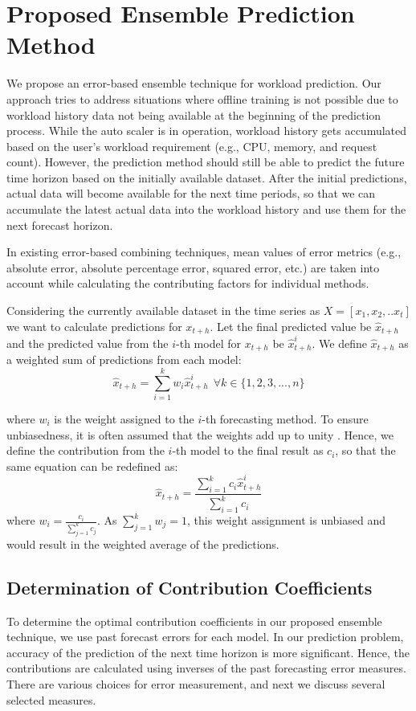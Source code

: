 \section{Proposed Ensemble Prediction Method}

We propose an error-based ensemble technique for workload prediction. Our approach tries to address situations where offline training is not possible due to workload history data not being available at the beginning of the prediction process. While the auto scaler is in operation, workload history gets accumulated based on the user's workload requirement (e.g., CPU, memory, and request count). However, the prediction method should still be able to predict the future time horizon based on the initially available dataset. After the initial predictions, actual data will become available for the next time periods, so that we can accumulate the latest actual data into the workload history and use them for the next forecast horizon.

In existing error-based combining techniques, mean values of error metrics (e.g., absolute error, absolute percentage error, squared error, etc.) are taken into account while calculating the contributing factors for individual methods. 

Considering the currently available dataset in the time series as
$X=[x_{1},x_{2},.. x_{t}]$
we want to calculate predictions for $x_{t+h}$. Let the final predicted value be $\hat{x}_{t+h}$ and the predicted value from the $i$-th model for $x_{t+h}$ be $\hat{x}_{t+h}^{i}$. We define $\hat{x}_{t+h}$ as a weighted sum of predictions from each model:
\begin{equation}
\hat{x}_{t+h}= \sum_{i=1}^{k}w_i \hat{x}_{t+h}^{i} \ \ \forall k \in \{1,2,3,...,n\}
\end{equation}

where $w_i$ is the weight assigned to the $i$-th forecasting method. To ensure unbiasedness, it is often assumed that the weights add up to unity \cite{Adhikari_2012}. Hence, we define the contribution from the $i$-th model to the final result as $c_i$, so that the same equation can be redefined as:
\begin{equation}
\hat{x}_{t+h}= \frac{\sum_{i=1}^{k}c_i \hat{x}_{t+h}^{i}}{\sum_{i=1}^{k}c_i}
\end{equation}
where $w_{i}= \frac{c_{i}}{\sum_{j=1}^{k}c_j}$. As $\sum_{j=1}^{k}w_{j}=1$, this weight assignment is unbiased and would result in the weighted average of the predictions.

\subsection{Determination of Contribution Coefficients}
To determine the optimal contribution coefficients in our proposed ensemble technique, we use past forecast errors for each model. In our prediction problem, accuracy of the prediction of the next time horizon is more significant. Hence, the contributions are calculated using inverses of the past forecasting error measures. There are various choices for error measurement, and next we discuss several selected measures.


